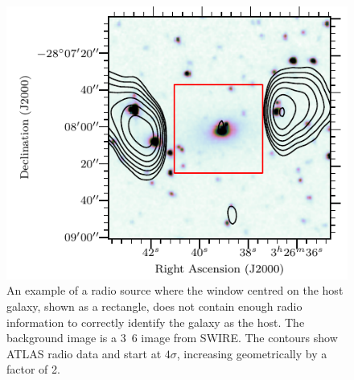     \begin{figure}
      \centering
      \includegraphics[width=\linewidth]{atlas-images/CI2363_fig.pdf}
      \caption[A radio source where the window centred on the host galaxy does not contain enough radio information to correctly identify the galaxy as a host.]{An example of a radio source where the window centred on the
        host galaxy, shown as a rectangle, does not contain enough radio
        information to correctly identify the galaxy as the host. {The background image
        is a \unit{3.6}{\micro\meter} image from SWIRE. The contours show ATLAS radio data and start at $4\sigma$, increasing geometrically by a factor of 2.}}
      \label{fig:broken-window-size}
    \end{figure}

